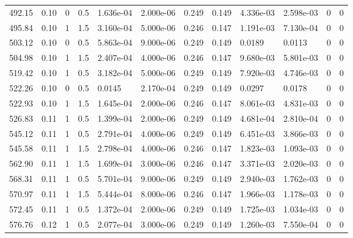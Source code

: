 \documentclass[preview]{standalone}
\begin{document}
{{\begin{tabular}{L{1.2cm}C{1.2cm} C{0.3cm}C{0.5cm} C{1.4cm}C{1.4cm} C{1.4cm}C{1.4cm} C{1.6cm}C{1.6cm} C{1.6cm}C{1.6cm}}
  492.15  &  0.10  & 0     & 0.5 &  1.636e-04  & 2.000e-06  &  0.249&   0.149& 4.336e-03 & 2.598e-03   &  0 & 0  \\ 
  495.84  &  0.10  & 1     & 1.5 &  3.160e-04  & 5.000e-06  &  0.246&   0.147& 1.191e-03 & 7.130e-04   &  0 & 0  \\ 
  503.12  &  0.10  & 0     & 0.5 &  5.863e-04  & 9.000e-06  &  0.249&   0.149& 0.0189 & 0.0113   &  0 & 0  \\ 
  504.98  &  0.10  & 1     & 1.5 &  2.407e-04  & 4.000e-06  &  0.246&   0.147& 9.680e-03 & 5.801e-03   &  0 & 0  \\ 
  519.42  &  0.10  & 1     & 0.5 &  3.182e-04  & 5.000e-06  &  0.249&   0.149& 7.920e-03 & 4.746e-03   &  0 & 0  \\ 
  522.26  &  0.10  & 0     & 0.5 &  0.0145  & 2.170e-04  &  0.249&   0.149& 0.0297 & 0.0178   &  0 & 0  \\ 
  522.93  &  0.10  & 1     & 1.5 &  1.645e-04  & 2.000e-06  &  0.246&   0.147& 8.061e-03 & 4.831e-03   &  0 & 0  \\ 
  526.83  &  0.11  & 1     & 0.5 &  1.399e-04  & 2.000e-06  &  0.249&   0.149& 4.681e-04 & 2.810e-04   &  0 & 0  \\ 
  545.12  &  0.11  & 1     & 0.5 &  2.791e-04  & 4.000e-06  &  0.249&   0.149& 6.451e-03 & 3.866e-03   &  0 & 0  \\ 
  545.58  &  0.11  & 1     & 1.5 &  2.798e-04  & 4.000e-06  &  0.246&   0.147& 1.823e-03 & 1.093e-03   &  0 & 0  \\ 
  562.90  &  0.11  & 1     & 1.5 &  1.699e-04  & 3.000e-06  &  0.246&   0.147& 3.371e-03 & 2.020e-03   &  0 & 0  \\ 
  568.31  &  0.11  & 1     & 0.5 &  5.701e-04  & 9.000e-06  &  0.249&   0.149& 2.940e-03 & 1.762e-03   &  0 & 0  \\ 
  570.97  &  0.11  & 1     & 1.5 &  5.444e-04  & 8.000e-06  &  0.246&   0.147& 1.966e-03 & 1.178e-03   &  0 & 0  \\ 
  572.45  &  0.11  & 1     & 0.5 &  1.372e-04  & 2.000e-06  &  0.249&   0.149& 1.725e-03 & 1.034e-03   &  0 & 0  \\ 
  576.76  &  0.12  & 1     & 0.5 &  2.077e-04  & 3.000e-06  &  0.249&   0.149& 1.260e-03 & 7.550e-04   &  0 & 0  \\ 
\hline 
\end{tabular} 

}}
\end{document}
